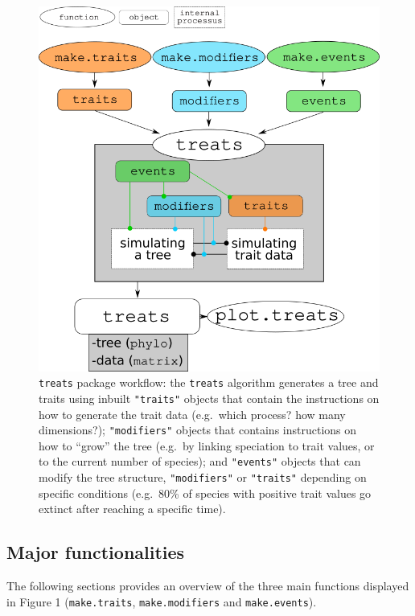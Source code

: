\documentclass[
]{article}
\begin{document}
\begin{figure}
\hypertarget{figure1}{%
\centering
\includegraphics{../inst/gitbook/treats_structure.png}
\caption{\texttt{treats} package workflow: the \texttt{treats} algorithm
generates a tree and traits using inbuilt \texttt{"traits"} objects that
contain the instructions on how to generate the trait data (e.g.~which
process? how many dimensions?); \texttt{"modifiers"} objects that
contains instructions on how to ``grow'' the tree (e.g.~by linking
speciation to trait values, or to the current number of species); and
\texttt{"events"} objects that can modify the tree structure,
\texttt{"modifiers"} or \texttt{"traits"} depending on specific
conditions (e.g.~80\% of species with positive trait values go extinct
after reaching a specific time).}\label{figure1}
}
\end{figure}

\hypertarget{major-functionalities}{%
\subsection{Major functionalities}\label{major-functionalities}}

The following sections provides an overview of the three main functions
displayed in Figure 1 (\texttt{make.traits}, \texttt{make.modifiers} and
\texttt{make.events}).
\end{document}
